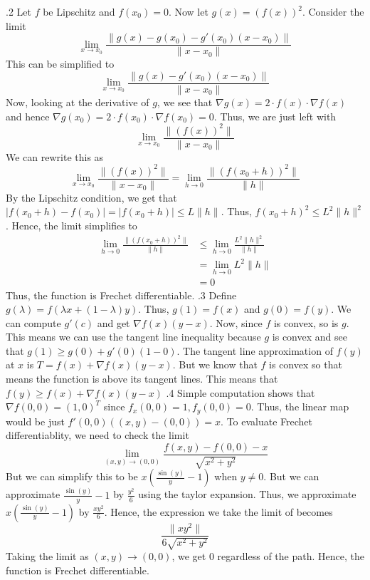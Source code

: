 \documentclass[12pt]{exam}
\begin{document}
\begin{questions}
.2\newline
Let $f$ be Lipschitz and $f(x_0) = 0$. Now let $g(x) = (f(x))^2$. Consider the limit \[\lim_{x \to x_0} \frac{\|g(x)-g(x_0)- g'(x_0)(x-x_0)\|}{\|x-x_0\|}\] This can be simplified to \[\lim_{x \to x_0} \frac{\|g(x)- g'(x_0)(x-x_0)\|}{\|x-x_0\|}\] Now, looking at the derivative of $g$, we see that $\nabla g(x) = 2\cdot f(x) \cdot \nabla f(x)$ and hence $\nabla g(x_0) =  2\cdot f(x_0) \cdot \nabla f(x_0) = 0$. Thus, we are just left with \[\lim_{x \to x_0} \frac{\|(f(x))^2\|}{\|x-x_0\|}\] We can rewrite this as 
\[
    \lim_{x \to x_0} \frac{\|(f(x))^2\|}{\|x-x_0\|} = \lim_{h \to 0} \frac{\|(f(x_0+h))^2\|}{\|h\|}
\]
By the Lipschitz condition, we get that $|f(x_0+h)-f(x_0)| =|f(x_0+h)| \leq L\|h\|$. Thus, $f(x_0+h)^2 \leq L^2\|h\|^2$. Hence, the limit simplifies to 
\begin{align*}
    \lim_{h \to 0} \frac{\|(f(x_0+h))^2\|}{\|h\|} &\leq \lim_{h \to 0} \frac{L^2\|h\|^2}{\|h\|}\\
    &=\lim_{h \to 0} L^2\|h\|\\
    &= 0
\end{align*}
Thus, the function is Frechet differentiable. 
.3 \newline
Define $g(\lambda) = f(\lambda x + (1-\lambda)y)$. Thus, $g(1) = f(x)$ and $g(0) = f(y)$. We can compute $g'(c)$ and get $\nabla f(x)(y-x)$. Now, since $f$ is convex, so is $g$. This means we can use the tangent line inequality because $g$ is convex and see that $g(1) \geq g(0) + g'(0)(1-0)$. The tangent line approximation of $f(y)$ at $x$ is $T = f(x)+\nabla f(x)(y-x)$. But we know that $f$ is convex so that means the function is above its tangent lines. This means that $f(y) \geq f(x) + \nabla f(x) (y-x)$
.4 \newline
Simple computation shows that $\nabla f(0,0) = (1,0)^T$ since $f_x(0,0) = 1, f_y(0,0)=0$. Thus, the linear map would be just $f'(0,0)((x,y)-(0,0)) = x$. To evaluate Frechet differentiablity, we need to check the limit \[\lim_{(x,y)\to(0,0)}\frac{f(x,y)-f(0,0)-x}{\sqrt{x^2+y^2}}\] But we can simplify this to be $x\left(\frac{\sin(y)}{y}-1\right)$ when $y \neq 0$. But we can approximate $\frac{\sin(y)}{y}-1$ by $\frac{y^2}{6}$ using the taylor expansion. Thus, we approximate $x\left(\frac{\sin(y)}{y}-1\right)$ by $\frac{xy^2}{6}$. Hence, the expression we take the limit of becomes \[\frac{\|xy^2\|}{6\sqrt{x^2+y^2}}\] Taking the limit as $(x,y) \to (0,0)$, we get $0$ regardless of the path. Hence, the function is Frechet differentiable. 

\end{questions}
\end{document}
